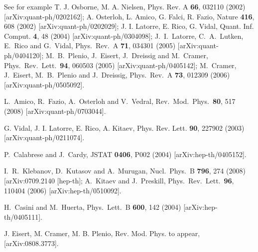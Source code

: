 \documentclass[11pt]{article}
\begin{document}
\begin{thebibliography}{99}
See for example T. J. Osborne, M. A. Nielsen, Phys. Rev. A {\bf  66}, 032110 (2002) [arXiv:quant-ph/0202162];
 A. Osterloh, L. Amico, G. Falci, R. Fazio, Nature {\bf 416}, 608 (2002) [arXiv:quant-ph/0202029];
 J. I. Latorre, E. Rico, G. Vidal, Quant. Inf. Comput. {\bf 4}, 48 (2004) [arXiv:quant-ph/0304098]; 
  J.~I.~Latorre, C.~A.~Lutken, E.~Rico and G.~Vidal,
  Phys.\ Rev.\  A {\bf 71}, 034301 (2005)
  [arXiv:quant-ph/0404120];
  M.~B.~Plenio, J.~Eisert, J.~Dreissig and M.~Cramer,
  Phys.\ Rev.\ Lett.\  {\bf 94}, 060503 (2005)
  [arXiv:quant-ph/0405142]; 
  M.~Cramer, J.~Eisert, M.~B.~Plenio and J.~Dreissig,
  Phys.\ Rev.\  A {\bf 73}, 012309 (2006)
  [arXiv:quant-ph/0505092]. 
  
L.~Amico, R.~Fazio, A.~Osterloh and V.~Vedral,
  Rev.\ Mod.\ Phys.\  {\bf 80}, 517 (2008)
  [arXiv:quant-ph/0703044].




 G. Vidal, J. I. Latorre, E. Rico, A. Kitaev, Phys. Rev. Lett. {\bf 90}, 227902 (2003) [arXiv:quant-ph/0211074].




P.~Calabrese and J.~Cardy,
JSTAT {\bf 0406}, P002 (2004)
[arXiv:hep-th/0405152].


  I.~R.~Klebanov, D.~Kutasov and A.~Murugan,
  Nucl.\ Phys.\  B {\bf 796}, 274 (2008)
  [arXiv:0709.2140 [hep-th];
  A.~Kitaev and J.~Preskill,
  Phys.\ Rev.\ Lett.\  {\bf 96}, 110404 (2006)
  [arXiv:hep-th/0510092].


H.~Casini and M.~Huerta,
Phys.\ Lett.\ B {\bf 600}, 142 (2004)
[arXiv:hep-th/0405111].

 J. Eisert, M. Cramer, M. B. Plenio, Rev. Mod. Phys. to appear,  [arXiv:0808.3773].



\end{thebibliography}
\end{document}
